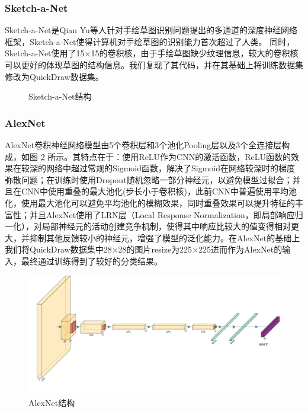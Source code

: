 \subsubsection{Sketch-a-Net}

Sketch-a-Net\cite{sketchanet}是Qian Yu等人针对手绘草图识别问题提出的多通道的深度神经网络框架，Sketch-a-Net使得计算机对手绘草图的识别能力首次超过了人类。
同时，Sketch-a-Net使用了15×15的卷积核，由于手绘草图缺少纹理信息，较大的卷积核可以更好的体现草图的结构信息。我们复现了其代码，并在其基础上将训练数据集修改为QuickDraw数据集。

\begin{figure}[htp]
    \centering
    
    \caption{Sketch-a-Net结构}
    \label{fig:sketch-a-net}
\end{figure}
\subsubsection{AlexNet}
AlexNet\cite{alexnet}卷积神经网络模型由5个卷积层和3个池化Pooling层以及3个全连接层构成，如图 \ref{fig:Alexnet} 所示。其特点在于：使用ReLU作为CNN的激活函数，ReLU函数的效果在较深的网络中超过常规的Sigmoid函数，解决了Sigmoid在网络较深时的梯度弥散问题；在训练时使用Dropout随机忽略一部分神经元，以避免模型过拟合；并且在CNN中使用重叠的最大池化(步长小于卷积核)，此前CNN中普遍使用平均池化，使用最大池化可以避免平均池化的模糊效果，同时重叠效果可以提升特征的丰富性；并且AlexNet使用了LRN层（Local Response Normalization，即局部响应归一化），对局部神经元的活动创建竞争机制，使得其中响应比较大的值变得相对更大，并抑制其他反馈较小的神经元，增强了模型的泛化能力。在AlexNet的基础上我们将QuickDraw数据集中28×28的图片resize为225×225进而作为AlexNet的输入，最终通过训练得到了较好的分类结果。
\begin{figure}[htp]
    \centering
    \includegraphics[width=15cm]{img/alexnet.pdf}
    
    \caption{AlexNet结构}
    \label{fig:Alexnet}
\end{figure}
